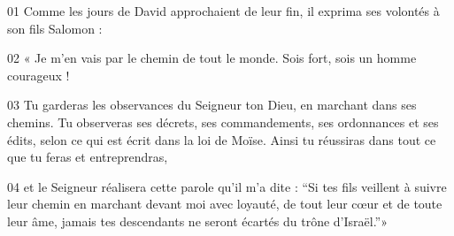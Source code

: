 01 Comme les jours de David approchaient de leur fin, il exprima ses volontés à son fils Salomon :

02 « Je m’en vais par le chemin de tout le monde. Sois fort, sois un homme courageux !

03 Tu garderas les observances du Seigneur ton Dieu, en marchant dans ses chemins. Tu observeras ses décrets, ses commandements, ses ordonnances et ses édits, selon ce qui est écrit dans la loi de Moïse. Ainsi tu réussiras dans tout ce que tu feras et entreprendras,

04 et le Seigneur réalisera cette parole qu’il m’a dite : “Si tes fils veillent à suivre leur chemin en marchant devant moi avec loyauté, de tout leur cœur et de toute leur âme, jamais tes descendants ne seront écartés du trône d’Israël.”»
